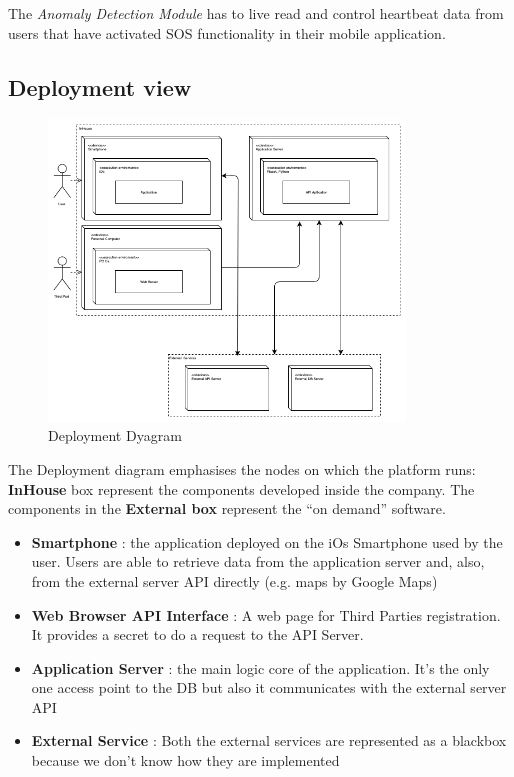 \documentclass[DD.tex]{subfiles}
\begin{document}
The \textit{Anomaly Detection Module} has to live read and control heartbeat data from users that have activated SOS functionality in their mobile application.


\newpage
\subsection{Deployment view}



\begin{figure}[h!]
	\centering
	\includegraphics[height=8.00cm,keepaspectratio]{Figures/DeploymentDiagram}
	\caption{Deployment Dyagram}
\end{figure}

The Deployment diagram emphasises the nodes on which the platform runs:\\
\textbf{InHouse} box represent the components developed inside the company.
The components in the \textbf{External box} represent the “on demand” software.\\
\begin{itemize}
\item	\textbf{Smartphone} : the application deployed on the iOs Smartphone used by the user. Users are able to retrieve data from the application server and, also, from the external 			server API directly (e.g. maps by Google Maps)
\item \textbf{Web Browser API Interface} : A web page for Third Parties registration. It provides a secret to do a request to the API Server.
\item \textbf{Application Server }: the  main logic core of the application. It’s the only one access point to the DB but also it communicates with the external server API
\item  \textbf{External Service} : Both the external services are represented as a blackbox because we don’t know how they are implemented 
\end{itemize}
\end{document}
